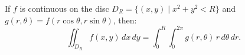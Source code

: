 If $f$ is continuous on the disc $D_R = \{(x, y) \mid x^2 + y^2 < R\}$ and $g(r, \theta) = f(r\cos\theta, r\sin\theta)$, then:
\[
\iint_{D_R} f(x, y)\,dx\,dy = \int_0^R \int_0^{2\pi} g(r, \theta)\, r\,d\theta\,dr.
\]
